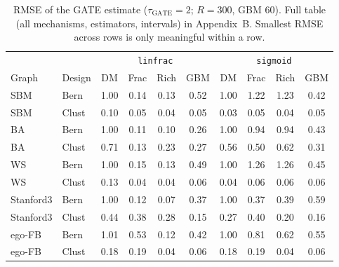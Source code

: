 \documentclass{article}
\begin{document}
\begin{table}[t]\centering\small
\caption{RMSE of the GATE estimate ($\tau_{\mathrm{GATE}}=2$; $R=300$, GBM 60). Full table (all mechanisms, estimators, intervals) in Appendix~B. Smallest RMSE across rows is only meaningful within a row.}\label{tab:small}
\setlength{\tabcolsep}{3.5pt}
\begin{tabular}{llcccc|cccc}\toprule
 & & \multicolumn{4}{c|}{\texttt{linfrac}} & \multicolumn{4}{c}{\texttt{sigmoid}}\\
Graph & Design & DM & Frac & Rich & GBM & DM & Frac & Rich & GBM\\\midrule
SBM & Bern & 1.00 & 0.14 & 0.13 & 0.52 & 1.00 & 1.22 & 1.23 & 0.42 \\
SBM & Clust & 0.10 & 0.05 & 0.04 & 0.05 & 0.03 & 0.05 & 0.04 & 0.05 \\
BA & Bern & 1.00 & 0.11 & 0.10 & 0.26 & 1.00 & 0.94 & 0.94 & 0.43 \\
BA & Clust & 0.71 & 0.13 & 0.23 & 0.27 & 0.56 & 0.50 & 0.62 & 0.31 \\
WS & Bern & 1.00 & 0.15 & 0.13 & 0.49 & 1.00 & 1.26 & 1.26 & 0.45 \\
WS & Clust & 0.13 & 0.04 & 0.04 & 0.06 & 0.04 & 0.06 & 0.06 & 0.06 \\
Stanford3 & Bern & 1.00 & 0.12 & 0.07 & 0.37 & 1.00 & 0.37 & 0.39 & 0.59 \\
Stanford3 & Clust & 0.44 & 0.38 & 0.28 & 0.15 & 0.27 & 0.40 & 0.20 & 0.16 \\
ego-FB & Bern & 1.01 & 0.53 & 0.12 & 0.42 & 1.00 & 0.81 & 0.62 & 0.55 \\
ego-FB & Clust & 0.18 & 0.19 & 0.04 & 0.06 & 0.18 & 0.19 & 0.04 & 0.06 \\
\bottomrule\end{tabular}\end{table}
\end{document}
